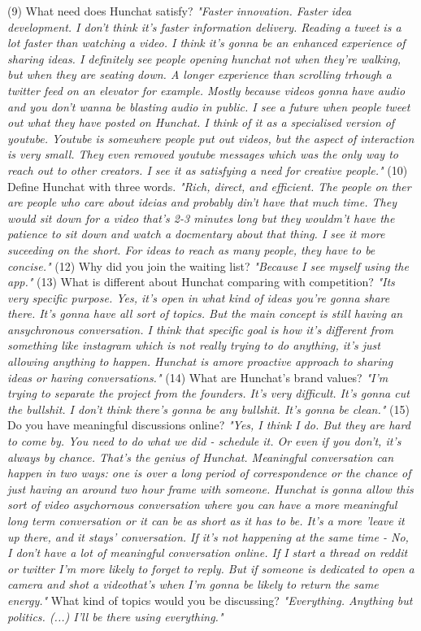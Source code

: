 \documentclass[12pt]{article}
\begin{document}
(9) What need does Hunchat satisfy? \textit{"Faster innovation. Faster idea development. I don't think it's faster information delivery. Reading a tweet is a lot faster than watching a video. I think it's gonna be an enhanced experience of sharing ideas. I definitely see people opening hunchat not when they're walking, but when they are seating down. A longer experience than scrolling trhough a twitter feed on an elevator for example. Mostly because videos gonna have audio and you don't wanna be blasting audio in public. I see a future when people tweet out what they have posted on Hunchat. I think of it as a specialised version of youtube. Youtube is somewhere people put out videos, but the aspect of interaction is very small. They even removed youtube messages which was the only way to reach out to other creators. I see it as satisfying a need for creative people."}
(10) Define Hunchat with three words. \textit{"Rich, direct, and efficient. The people on ther are people who care about ideias and probably din't have that much time. They would sit down for a video that's 2-3 minutes long but they wouldm't have the patience to sit down and watch a docmentary about that thing. I see it more suceeding on the short. For ideas to reach as many people, they have to be concise."}
(12) Why did you join the waiting list?  \textit{"Because I see myself using the app."}
(13) What is different about Hunchat comparing with competition?  \textit{"Its very specific purpose. Yes, it's open in what kind of ideas you're gonna share there. It's gonna have all sort of topics. But the main concept is still having an ansychronous conversation. I think that specific goal is how it's different from something like instagram which is not really trying to do anything, it's just allowing anything to happen. Hunchat is amore proactive approach to sharing ideas or having conversations."}
 (14) What are Hunchat’s brand values?  \textit{"I'm trying to separate the project from the founders. It's very difficult. It's gonna cut the bullshit. I don't think there's gonna be any bullshit. It's gonna be clean."}
(15) Do you have meaningful discussions online?  \textit{"Yes, I think I do. But they are hard to come by. You need to do what we did - schedule it. Or even if you don't, it's always by chance. That's the genius of Hunchat. Meaningful conversation can happen in two ways: one is over a long period of correspondence or the chance of just having an around two hour frame with someone. Hunchat is gonna allow this sort of video asychornous conversation where you can have a more meaningful long term conversation or it can be as short as it has to be. It's a more 'leave it up there, and it stays' conversation. If it's not happening at the same time - No, I don't have a lot of meaningful conversation online. If I start a thread on reddit or twitter I'm more likely to forget to reply. But if someone is dedicated to open a camera and shot a videothat's when I'm gonna be likely to return the same energy."} What kind of topics would you be discussing?  \textit{"Everything. Anything but politics. (...) I'll be there using everything."}  
\end{document}
